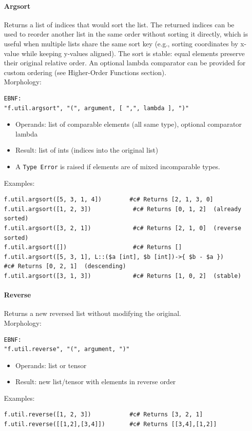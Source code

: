 \paragraph{Argsort}
Returns a list of indices that would sort the list. The returned indices can be used to reorder another list in the same order without sorting it directly, which is useful when multiple lists share the same sort key (e.g., sorting coordinates by x-value while keeping y-values aligned). The sort is stable: equal elements preserve their original relative order. An optional lambda comparator can be provided for custom ordering (see Higher-Order Functions section).\\
Morphology:
\begin{verbatim}
EBNF:
"f.util.argsort", "(", argument, [ ",", lambda ], ")"
\end{verbatim}
\begin{itemize}
\item Operands: list of comparable elements (all same type), optional comparator lambda
\item Result: list of ints (indices into the original list)
\item A \texttt{Type Error} is raised if elements are of mixed incomparable types.
\end{itemize}
Examples:
\begin{verbatim}
f.util.argsort([5, 3, 1, 4])        #c# Returns [2, 1, 3, 0]
f.util.argsort([1, 2, 3])            #c# Returns [0, 1, 2]  (already sorted)
f.util.argsort([3, 2, 1])            #c# Returns [2, 1, 0]  (reverse sorted)
f.util.argsort([])                   #c# Returns []
f.util.argsort([5, 3, 1], L::($a [int], $b [int])->{ $b - $a })
#c# Returns [0, 2, 1]  (descending)
f.util.argsort([3, 1, 3])            #c# Returns [1, 0, 2]  (stable)
\end{verbatim}

\paragraph{Reverse}
Returns a new reversed list without modifying the original.\\
Morphology:
\begin{verbatim}
EBNF:
"f.util.reverse", "(", argument, ")"
\end{verbatim}
\begin{itemize}
\item Operands: list or tensor
\item Result: new list/tensor with elements in reverse order
\end{itemize}
Examples:
\begin{verbatim}
f.util.reverse([1, 2, 3])           #c# Returns [3, 2, 1]
f.util.reverse([[1,2],[3,4]])       #c# Returns [[3,4],[1,2]]
\end{verbatim}

